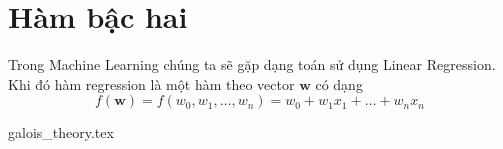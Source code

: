 \documentclass{mynotes}
\begin{document}
\section*{Hàm bậc hai}

Trong Machine Learning chúng ta sẽ gặp dạng toán sử dụng Linear Regression. Khi đó hàm regression là một hàm theo vector $\bm{w}$ có dạng \[ f(\bm{w}) = f (w_0, w_1, \ldots, w_n) = w_0 + w_1 x_1 + \ldots + w_n x_n \]

{galois_theory.tex}
\end{document}
